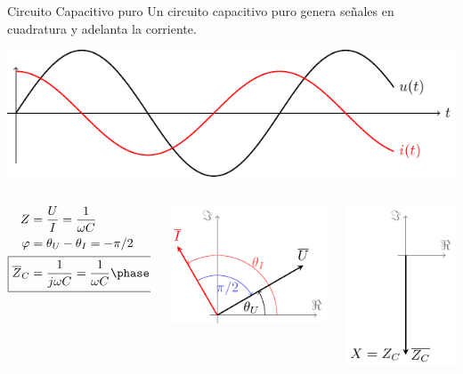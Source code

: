 \documentclass[aspectratio=169, usenames,svgnames,dvipsnames]{beamer}
\begin{document}
\begin{frame}[label={sec:orga056bfd}]{Circuito Capacitivo puro}
Un circuito capacitivo puro genera \alert{señales en cuadratura} y \alert{adelanta la corriente}.

\begin{center}
\includegraphics[height=0.3\textheight]{../figs/capacitivoPuro.pdf}
\end{center}

\begin{columns}
\begin{column}{0.3\columnwidth}
\begin{align*}
  Z &= \frac{U}{I} = \frac{1}{\omega C}\\
  \varphi &= \theta_U - \theta_I = - \pi/2\\
  \Aboxed{\overline{Z}_C &= \frac{1}{j\omega C} = \frac{1}{\omega C}\phase{\ang{-90}}}
\end{align*}
\end{column}


\begin{column}{0.4\columnwidth}
\begin{center}
\includegraphics[height=0.4\textheight]{../figs/fasorCondensador_VI.pdf}
\end{center}
\end{column}


\begin{column}{0.3\columnwidth}
\begin{center}
\includegraphics[height=0.4\textheight]{../figs/fasorCondensador.pdf}
\end{center}
\end{column}
\end{columns}
\end{frame}
\end{document}
